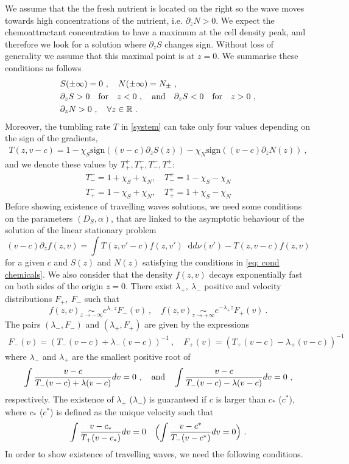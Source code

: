 \documentclass[11pt,twoside]{article}
\newcommand*\diff{\mathop{}\!\mathrm{d}}
\numberwithin{equation}{section}
\begin{document}
We assume that the the fresh nutrient is located on the right so the wave moves towards high concentrations of the nutrient, i.e.  $\partial_zN>0$. We expect the chemoattractant concentration to have a maximum at the cell density peak, and therefore we look for a solution where  $\partial_zS$ changes sign. Without loss of generality we assume that this maximal point is at $z=0$.  We summarise these conditions as follows
\begin{equation}
\begin{aligned}
 &S(\pm \infty)=0\ ,\quad N(\pm\infty)=N_\pm\ ,\\
&\partial_z S>0  \quad  \textrm{for}\quad z<0\ , \quad\textnormal{and}\quad\partial_z S<0 \quad \textrm{for}\quad z>0\ ,\\
&\partial_zN>0\ ,\quad\forall z\in\mathbb{R}\ .\label{eq: cond chemicals}
\end{aligned}
\end{equation}
Moreover, the tumbling rate $T$ in \eqref{system} can take only four values depending on the sign of the gradients,
\begin{eqnarray}\label{tumbl}
   T(z,v-c)=1-\chi_S \textrm{sign}((v-c)\partial_z S(z))-\chi_N \textrm{sign}((v-c)\partial_z N(z))\ ,
\end{eqnarray}
and we denote these values by $T^+_+,T^-_+, T^-_-, T^+_- $:
\begin{align*}
T^-_-=1+\chi_S+\chi_N,\quad T^+_-=1-\chi_S-\chi_N\\
T^-_+=1-\chi_S+\chi_N,\quad T^+_+=1+\chi_S-\chi_N
\end{align*}
Before showing existence of travelling waves solutions, we need some conditions on the parameters $(D_S,\alpha)$,
that are linked to the asymptotic behaviour of the solution of the linear stationary problem
\[
(v-c)\partial_zf(z,v)=\int T(z,v'-c)f(z,v')\diff d\nu(v')-T(z,v-c)f(z,v)
\]
for a given $c$ and $S(z)$ and $N(z)$ satisfying the conditions in \eqref{eq: cond chemicals}. We also consider that the density $f(z,v)$ decays exponentially fast on both sides of the origin $z=0$. There exist $\lambda_+,\ \lambda_-$ positive and velocity distributions $F_+,\ F_-$ such that
\[
f(z,v)\underset{z\to-\infty}{\sim} e^{\lambda_-z}F_-(v)\ , \quad f(z,v)\underset{z\to+\infty}{\sim} e^{-\lambda_+z}F_+(v)\ .
\]
The pairs $(\lambda_-,F_-)$ and $(\lambda_+,F_+)$ are given by the expressions
\begin{align}
    F_-(v)=(T_-(v-c)+\lambda_-(v-c))^{-1}\ ,\quad F_+(v)=(T_+(v-c)-\lambda_+(v-c))^{-1}
\end{align}
where $\lambda_-$ and $\lambda_+$ are the smallest positive root of
\[
\int\frac{v-c}{T_-(v-c)+\lambda(v-c)}dv=0\ ,\quad\textnormal{and}\quad \int\frac{v-c}{T_-(v-c)-\lambda(v-c)}dv=0\ ,
\]
respectively.
The existence of $\lambda_{+}$ ($\lambda_-$) is guaranteed if $c$ is larger than $c_*$ ($c^*$), where $c_*$ ($c^*$) is defined as the unique velocity such that
\[
\int \frac{v-c_*}{T_+(v-c_*)}dv=0\quad \Bigl(\int \frac{v-c^*}{T_-(v-c^*)}dv=0 \Bigr)\ .
\]
In order to show existence of travelling waves, we need the following conditions.
\end{document}
